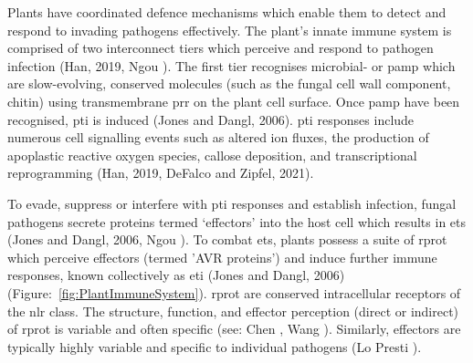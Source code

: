 Plants have coordinated defence mechanisms which enable them to detect and respond to invading pathogens effectively. The plant’s innate immune system is comprised of two interconnect tiers which perceive and respond to pathogen infection (Han, 2019, Ngou ). The first tier recognises microbial- or \ac{pamp} which are slow-evolving, conserved molecules (such as the fungal cell wall component, chitin) using transmembrane \ac{prr} on the plant cell surface. Once \ac{pamp} have been recognised, \ac{pti} is induced (Jones and Dangl, 2006). \ac{pti} responses include numerous cell signalling events such as altered ion fluxes, the production of apoplastic reactive oxygen species, callose deposition, and transcriptional reprogramming (Han, 2019, DeFalco and Zipfel, 2021). 

To evade, suppress or interfere with \ac{pti} responses and establish infection, fungal pathogens secrete proteins termed ‘effectors’ into the host cell which results in \ac{ets} (Jones and Dangl, 2006, Ngou ). To combat \ac{ets}, plants possess a suite of \ac{rprot} which perceive effectors (termed '\ac{AVR} proteins') and induce further immune responses, known collectively as \ac{eti} (Jones and Dangl, 2006) (Figure:~\ref{fig:PlantImmuneSystem}). \ac{rprot} are conserved intracellular receptors of the \ac{nlr} class. The structure, function, and effector perception (direct or indirect) of \ac{rprot} is variable and often specific (see: Chen , Wang ). Similarly, effectors are typically highly variable and specific to individual pathogens (Lo Presti ). 

